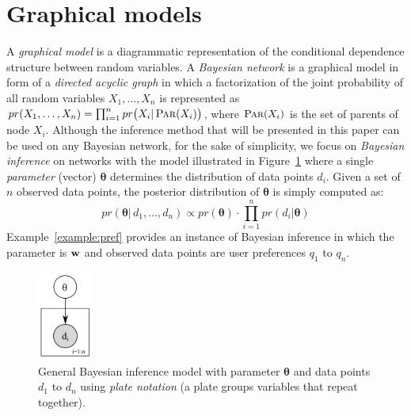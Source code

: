 \section{Graphical models}
\label{sec:graph_models}
A \emph{graphical model} is a diagrammatic representation of the conditional dependence structure between random variables. 
A \emph{Bayesian network} is a graphical model in form of a \emph{directed acyclic graph}
in which a factorization of the joint probability of all random variables $X_1,\ldots,X_n$ is represented as 
$pr(X_1,\ldots,X_n)=\prod_{i=1}^n pr \big( X_i | \, \textsc{Par}(X_i)\big)$, 
where $\textsc{Par}(X_i)$ is the set of parents of node $X_i$.
Although the inference method that will be presented in this paper can be used on 
any Bayesian network, for the sake of simplicity, we focus on \emph{Bayesian inference} 
on networks with the model illustrated in Figure~\ref{fig:naive} where a single \emph{parameter} (vector) $\boldsymbol\theta$
determines the distribution of data points $d_i$. 
Given a set of $n$ observed data points, 
the posterior distribution of $\boldsymbol\theta$ is simply computed as:
\begin{equation}
\label{e:posterior}
pr(\boldsymbol\theta | \, d_1, \ldots, d_n) 
\propto pr(\boldsymbol\theta) \cdot \prod_{i=1}^{n} pr(d_i | \boldsymbol\theta)
\end{equation} 
Example~\ref{example:pref} provides an instance of Bayesian inference in which the parameter is $\textbf{w}$
and observed data points are user preferences $q_1$ to $q_n$.
\begin{figure}
\centering
\includegraphics[width=0.16\textwidth]{pic/naive.pdf}
\caption{\footnotesize General Bayesian inference model with parameter $\boldsymbol\theta$ and data points $d_1$ to $d_n$ using \emph{plate notation}
(a plate groups variables that repeat together).
}
\label{fig:naive}
\end{figure}


